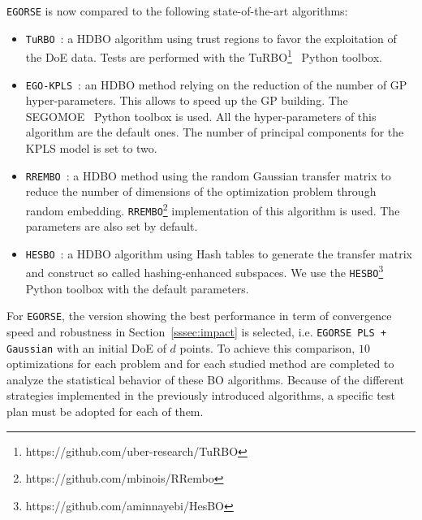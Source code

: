 \texttt{EGORSE} is now compared to the following state-of-the-art algorithms:
\begin{itemize}
    \item \texttt{TuRBO}~\cite{erikssonScalableGlobalOptimization2019a}: a HDBO algorithm using trust regions to favor the exploitation of the DoE data.
    Tests are performed with the TuRBO\footnote{https://github.com/uber-research/TuRBO}~\cite{erikssonScalableGlobalOptimization2019a} Python toolbox.
    \item   \texttt{EGO-KPLS}~\cite{BouhlelEfficientglobaloptimization2018}: an HDBO method relying on the reduction of the number of GP hyper-parameters.
    This allows to speed up the GP building. 
    The SEGOMOE~\cite{bartoliAdaptiveModelingStrategy2019} Python toolbox is used.
    All the hyper-parameters of this algorithm are the default ones.
    The number of principal components for the KPLS model is set to two.
    \item  \texttt{RREMBO}~\cite{binoisChoiceLowdimensionalDomain2020}: a HDBO method using the random Gaussian transfer matrix to reduce the number of dimensions of the optimization problem through random embedding.
     \texttt{RREMBO}\footnote{https://github.com/mbinois/RRembo} implementation of this algorithm is used.
    The parameters are also set by default.
    \item   \texttt{HESBO}~\cite{nayebiFrameworkBayesianOptimization2019}: a HDBO algorithm using Hash tables to generate the transfer matrix and construct so called hashing-enhanced subspaces. 
    We use the \texttt{HESBO}\footnote{https://github.com/aminnayebi/HesBO} Python toolbox with the default parameters.
\end{itemize}
For \texttt{EGORSE}, the version showing the best performance in term of convergence speed and robustness in Section~\ref{sssec:impact} is selected, i.e.  \texttt{{\texttt{EGORSE}} PLS + Gaussian} with an initial DoE of $d$ points.
To achieve this comparison, $10$ optimizations for each problem and  for each studied method are completed to analyze the statistical behavior of these BO algorithms.
Because of the different strategies implemented in the previously introduced algorithms, a specific test plan must be adopted for each of them.
